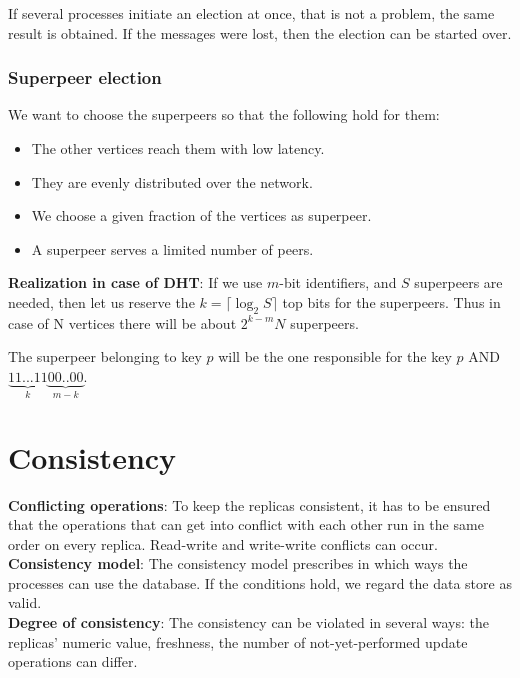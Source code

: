 \documentclass[margin=0px]{article}
\begin{document}
If several processes initiate an election at once, that is not a problem, the same result is obtained. If the messages
were lost, then the election can be started over.

\subsubsection{Superpeer election}

We want to choose the superpeers so that the following hold for them:

\begin{itemize}
    \item	The other vertices reach them with low latency.
    \item	They are evenly distributed over the network.
    \item	We choose a given fraction of the vertices as superpeer.
    \item	A superpeer serves a limited number of peers.
\end{itemize}

\noindent \textbf{Realization in case of DHT}: If we use $m$-bit identifiers, and $S$ superpeers are needed, then
let us reserve the $k= \lceil \log_{2} S \rceil$ top bits for the superpeers. Thus in case of N vertices there will be about $2^{k-m}N$
superpeers.

The superpeer belonging to key $p$ will be the one responsible for the key $p$ AND $\underbrace{11...11}_{k}\underbrace{00..00}_{m-k}$.

\section{Consistency}

\noindent \textbf{Conflicting operations}: To keep the replicas consistent, it has to be ensured that the operations that can
get into conflict with each other run in the same order on every replica. Read-write and write-write
conflicts can occur.\\

\noindent \textbf{Consistency model}: The consistency model prescribes in which ways the processes can use
the database. If the conditions hold, we regard the data store as valid.\\

\noindent \textbf{Degree of consistency}: The consistency can be violated in several ways: the replicas' numeric value,
freshness, the number of not-yet-performed update operations can differ.\\
\end{document}
